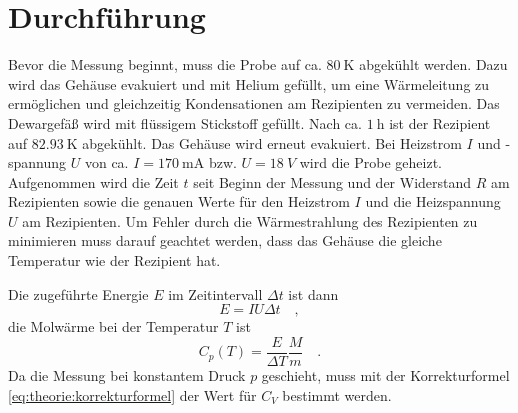 

\section{Durchführung}
Bevor die Messung beginnt, muss die Probe auf ca. $\SI{80}{\kelvin}$ 
abgekühlt werden. Dazu wird das Gehäuse evakuiert und mit Helium gefüllt, um eine 
Wärmeleitung zu ermöglichen und gleichzeitig 
Kondensationen am Rezipienten zu vermeiden. Das Dewargefäß wird mit 
flüssigem Stickstoff gefüllt. Nach ca. $\SI{1}{\hour}$ ist der Rezipient auf 
$\SI{82.93}{\kelvin}$ abgekühlt. Das Gehäuse wird erneut evakuiert. Bei 
Heizstrom $I$ und -spannung $U$ von ca. $I=\SI{170}{\milli \ampere}$ bzw. $U=\SI{18}{V}$ wird die Probe geheizt.
Aufgenommen wird die Zeit $t$ seit Beginn der Messung und der Widerstand $R$ 
am Rezipienten sowie die genauen Werte für den Heizstrom $I$ und die 
Heizspannung $U$ am Rezipienten. Um Fehler durch die Wärmestrahlung des 
Rezipienten zu minimieren muss darauf geachtet werden, dass das Gehäuse 
die gleiche Temperatur wie der Rezipient hat.

Die zugeführte Energie $E$ im Zeitintervall $\Delta t$ ist dann
\begin{equation}
E = IU \Delta t  \quad ,
\end{equation}
die Molwärme bei der Temperatur $T$ ist 
\begin{equation}
C_p (T) = \frac{E}{\Delta T} \frac{M}{m} \quad .
\end{equation}
Da die Messung bei konstantem Druck $p$ geschieht, muss mit der Korrekturformel 
\eqref{eq:theorie:korrekturformel} der Wert für $C_V$ bestimmt werden.

